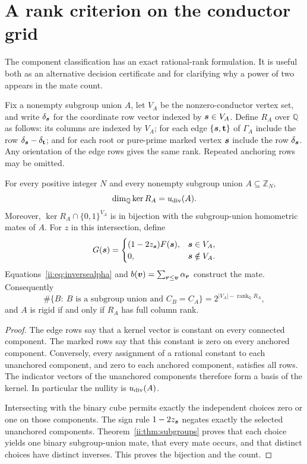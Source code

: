 \section{A rank criterion on the conductor grid}\label{v2:sec:rank}
The component classification has an exact rational-rank formulation. It is useful both as an alternative decision certificate and for clarifying why a power of two appears in the mate count.

Fix a nonempty subgroup union $A$, let $V_A$ be the nonzero-conductor vertex set, and write $\delta_{\boldsymbol{s}}$ for the coordinate row vector indexed by $\boldsymbol{s}\in V_A$. Define $R_A$ over $\mathbb Q$ as follows: its columns are indexed by $V_A$; for each edge $\{\boldsymbol{s},\mathbf t\}$ of $\Gamma_A$ include the row $\delta_{\boldsymbol{s}}-\delta_{\mathbf t}$; and for each root or pure-prime marked vertex $\boldsymbol{s}$ include the row $\delta_{\boldsymbol{s}}$. Any orientation of the edge rows gives the same rank. Repeated anchoring rows may be omitted.

\begin{theorem}\label{v2:thm:rank}
For every positive integer $N$ and every nonempty subgroup union $A\subseteq\mathbb Z_N$,
\[
 \dim_{\mathbb Q}\ker R_A=u_{\rm div}(A).
\]
Moreover, $\ker R_A\cap\{0,1\}^{V_A}$ is in bijection with the subgroup-union homometric mates of $A$. For $z$ in this intersection, define
\[
 G(\boldsymbol{s})=\begin{cases}
       (1-2z_{\boldsymbol{s}})F(\boldsymbol{s}),&\boldsymbol{s}\in V_A,\\
       0,&\boldsymbol{s}\notin V_A.
       \end{cases}
\]
Equations~\eqref{ii:eq:inversealpha} and $b(\boldsymbol{v})=\sum_{\boldsymbol{r}\leq\boldsymbol{v}}\alpha_{\boldsymbol{r}}$ construct the mate. Consequently
\[
 \#\{B:\ B\text{ is a subgroup union and }C_B=C_A\}
   =2^{|V_A|-\operatorname{rank}_{\mathbb Q}R_A},
\]
and $A$ is rigid if and only if $R_A$ has full column rank.
\end{theorem}
\begin{proof}
The edge rows say that a kernel vector is constant on every connected component. The marked rows say that this constant is zero on every anchored component. Conversely, every assignment of a rational constant to each unanchored component, and zero to each anchored component, satisfies all rows. The indicator vectors of the unanchored components therefore form a basis of the kernel. In particular the nullity is $u_{\rm div}(A)$.

Intersecting with the binary cube permits exactly the independent choices zero or one on those components. The sign rule $1-2z_{\boldsymbol{s}}$ negates exactly the selected unanchored components. Theorem~\ref{ii:thm:subgroups} proves that each choice yields one binary subgroup-union mate, that every mate occurs, and that distinct choices have distinct inverses. This proves the bijection and the count.
\end{proof}

